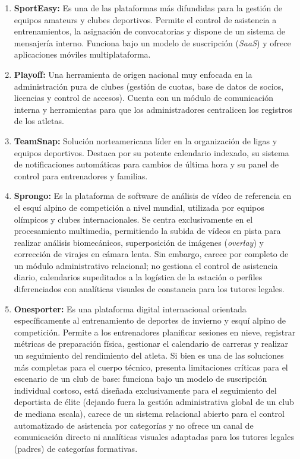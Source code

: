     \begin{enumerate}
        \item \textbf{SportEasy:} Es una de las plataformas más difundidas para la gestión de equipos amateurs y clubes deportivos. Permite el control de asistencia a entrenamientos, la asignación de convocatorias y dispone de un sistema de mensajería interno. Funciona bajo un modelo de suscripción (\textit{SaaS}) y ofrece aplicaciones móviles multiplataforma.
        \item \textbf{Playoff:} Una herramienta de origen nacional muy enfocada en la administración pura de clubes (gestión de cuotas, base de datos de socios, licencias y control de accesos). Cuenta con un módulo de comunicación interna y herramientas para que los administradores centralicen los registros de los atletas.
        \item \textbf{TeamSnap:} Solución norteamericana líder en la organización de ligas y equipos deportivos. Destaca por su potente calendario indexado, su sistema de notificaciones automáticas para cambios de última hora y su panel de control para entrenadores y familias.
        \item \textbf{Sprongo:} Es la plataforma de software de análisis de vídeo de referencia en el esquí alpino de competición a nivel mundial, utilizada por equipos olímpicos y clubes internacionales. Se centra exclusivamente en el procesamiento multimedia, permitiendo la subida de vídeos en pista para realizar análisis biomecánicos, superposición de imágenes (\textit{overlay}) y corrección de virajes en cámara lenta. Sin embargo, carece por completo de un módulo administrativo relacional; no gestiona el control de asistencia diario, calendarios supeditados a la logística de la estación o perfiles diferenciados con analíticas visuales de constancia para los tutores legales.
        \item \textbf{Onesporter:} Es una plataforma digital internacional orientada específicamente al entrenamiento de deportes de invierno y esquí alpino de competición. Permite a los entrenadores planificar sesiones en nieve, registrar métricas de preparación física, gestionar el calendario de carreras y realizar un seguimiento del rendimiento del atleta. Si bien es una de las soluciones más completas para el cuerpo técnico, presenta limitaciones críticas para el escenario de un club de base: funciona bajo un modelo de suscripción individual costoso, está diseñada exclusivamente para el seguimiento del deportista de élite (dejando fuera la gestión administrativa global de un club de mediana escala), carece de un sistema relacional abierto para el control automatizado de asistencia por categorías y no ofrece un canal de comunicación directo ni analíticas visuales adaptadas para los tutores legales (padres) de categorías formativas.
    \end{enumerate}

